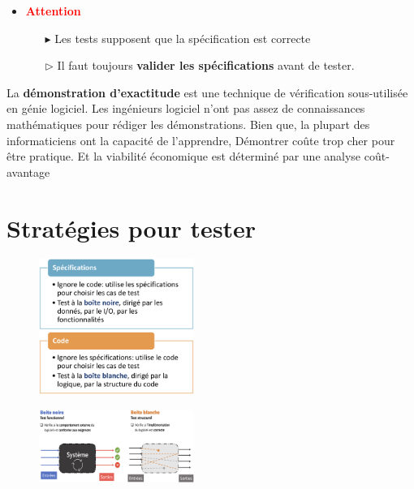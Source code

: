 \documentclass[16pt]{report}
\begin{document}
\begin{multicols*}{2}
       \begin{itemize}
        \item \textbf{\textcolor{red}{Attention}  }  
            \begin{itemize}
                \item[$\blacktriangleright$] Les tests supposent que la spécification est correcte
                \item[$\rhd$] Il faut toujours \textbf{valider les spécifications} avant de tester.   
            \end{itemize}
       \end{itemize}


       \begin{note}{}{}
           La \textbf{démonstration d’exactitude} est une technique de vérification sous-utilisée 
           en génie logiciel. Les ingénieurs logiciel n’ont pas assez de connaissances mathématiques 
           pour rédiger les démonstrations. Bien que, la plupart des informaticiens ont la capacité de l’apprendre, 
           Démontrer coûte trop cher pour être pratique. Et la \textcolor{myb}{viabilité économique}
           est déterminé par une analyse coût-avantage 
       \end{note}

       \section{Stratégies pour tester}


       \begin{figure}[H]
        \begin{center}
            \includegraphics[width=0.45\textwidth]{strattest1.png}
        \end{center}
       \end{figure}
       
       


       \begin{figure}[H]
        \begin{center}
            \includegraphics[width=0.45\textwidth]{strattest2.png}
        \end{center}
       \end{figure}
 



\end{multicols*}
\end{document}
